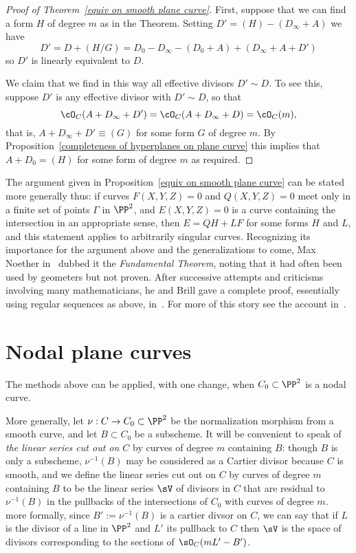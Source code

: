 
\begin{proof}[Proof of Theorem~\ref{equiv on smooth plane curve}]
First, suppose that we can find a form $H$ of degree $m$ as in the Theorem.
Setting $D' = (H) -(D_\infty+A)$ we have
$$
D' = D + (H/G) = D_0- D_\infty - (D_0+A)+(D_\infty+A+D')
$$
so $D'$ is linearly equivalent to $D$. 

We claim that we find in this way all effective divisors $D' \sim D$. 
To see this, suppose $D'$ is any effective divisor with $D' \sim D$, so that
$$
\cO_C(A+D_\infty+D') = \cO_C(A+D_\infty+D)  = \cO_C(m),
$$
that is, $A+D_\infty+D' \equiv (G)$ for some form $G$ of degree $m$. By Proposition~\ref{completeness of hyperplanes on plane curve}
this implies that $A+D_{0} = (H)$ for some form of degree $m$ as required.
\end{proof}


The argument given in Proposition~\ref{equiv on smooth plane curve} can be stated more generally thus:  if curves $F(X,Y,Z)=0$ and $Q(X,Y,Z)=0$ 
meet only in a finite set of points $\Gamma$ in $\PP^{2}$, and $E(X,Y,Z) = 0$ is a curve containing the intersection in an appropriate sense,
then $E = QH +LF$ for some forms $H$ and $L$, and this statement applies to arbitrarily singular curves. Recognizing its importance for the argument above and the generalizations to come, Max Noether in~\cite{Noether1873} dubbed it the \emph{Fundamental Theorem}, 
noting that it had often been used by geometers but not proven. After successive attempts and 
criticisms involving many mathematicians, he and Brill gave a complete proof, essentially using
regular sequences as above, in~\cite{Brill-Noether}. For more of this story see the account in~\cite{Eisenbud-Gray}.



\section{Nodal plane curves}\label{nodal curves section}

The methods above can be applied, with one change, when $C_{0}\subset \PP^{2}$
is a nodal curve.

More generally, let $\nu: C\to C_{0}\subset \PP^{2}$ be the normalization morphism from a smooth curve,
and let $B\subset C_{0}$ be a subscheme.
It will be convenient to speak of \emph{the linear series cut out on $C$} by curves of degree $m$
containing $B$: though $B$ is only a subscheme, $\nu^{-1}(B)$ may be considered as a Cartier divisor because
$C$ is smooth, and we define
the linear series cut out on $C$ by curves of degree $m$
containing $B$ to be
the linear series  $\sV$ of divisors in $C$ that are residual to $\nu^{-1}(B)$ in the pullbacks 
of the intersections of $C_{0}$ with curves of degree $m$. more formally, since $B' := \nu^{-1}(B)$
is a cartier divsor on $C$, we can say that if $L$ is the divisor of a line in $\PP^{2}$ and $L'$
its pullback to $C$ then
$\sV$ is the space of divisors corresponding to the
sections of $\sO_{C}(mL'-B')$.

